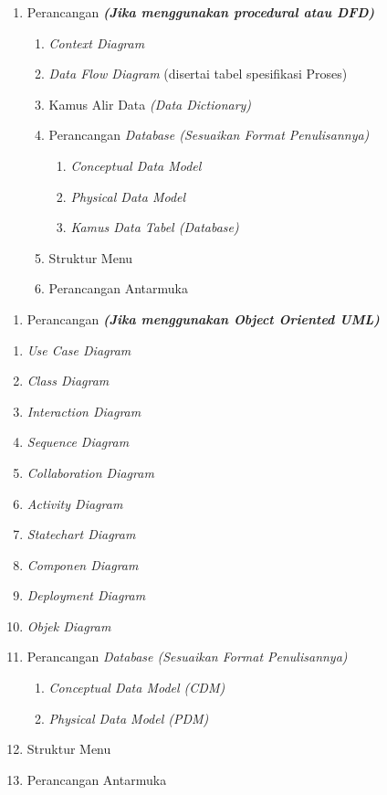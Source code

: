 \begin{enumerate}
\begin{enumerate} [label=3.\arabic*]
			
		\item Perancangan \textit{\textbf{(Jika	menggunakan	procedural 					  atau DFD)}}
			\begin{enumerate} [label=3.2.\arabic*]
				\item \textit{Context	Diagram}
				\item \textit {Data	Flow	Diagram} (disertai	tabel									  spesifikasi	Proses)
				\item Kamus	Alir	Data \textit{(Data Dictionary)}
				\item 	Perancangan	 \textit{Database (Sesuaikan	Format							Penulisannya)}
					\begin{enumerate} [label=3.2.4.\arabic*]
						\item \textit{Conceptual	Data	Model}
						\item \textit{Physical	Data	Model}
						\item \textit{Kamus	Data	Tabel (Database)}	
					\end{enumerate}
				\item Struktur Menu
				\item Perancangan Antarmuka
			\end{enumerate}
			
	\end{enumerate}
			
			\begin{enumerate} [label=3.2]
				\item Perancangan \textit{\textbf{(Jika	menggunakan 							  	Object	Oriented UML)}}
			\end{enumerate}
				\begin{enumerate} [label=3.2.\arabic*]
				\item \textit{Use	Case	Diagram}
				\item \textit{Class	Diagram}
				\item \textit{Interaction	Diagram}
				\item \textit{Sequence	Diagram}
				\item \textit{Collaboration	Diagram}
				\item \textit{Activity	Diagram}
				\item \textit{Statechart	Diagram}
				\item \textit{Componen	Diagram}
				\item \textit{Deployment	Diagram}
				\item \textit{Objek	Diagram}
				\item Perancangan \textit{Database (Sesuaikan	Format							  Penulisannya)}
						\begin{enumerate}[label=(\alph*)]
							\item \textit{Conceptual Data Model	(CDM)}
							\item \textit{Physical	Data Model (PDM)}
						\end{enumerate}
				\item Struktur	Menu
				\item Perancangan	Antarmuka
				\end{enumerate} 
				

\end{enumerate}
